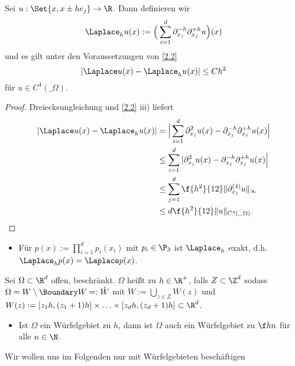 \begin{kor} \label{2.3}
	Sei $u : \Set{x, x \pm h e_j} \to \R$.
	Dann definieren wir
	\begin{equation} \label{eq:2.1}
		\Laplace_h u(x) :=
		\Big(\sum_{i=1}^d \partial_{x_j}^{-h} \partial_{x_j}^{+h} u \Big) (x)
	\end{equation}
	und es gilt unter den Voraussetzungen von \ref{2.2}
	\[
		|\Laplace u(x) - \Laplace_h u(x)| \le C h^2
	\]
	für $u \in C^4(\_\Omega)$.
	\begin{proof}
		Dreiecksungleichung und \ref{2.2} iii) liefert
		\begin{align*}
			|\Laplace u(x) - \Laplace_h u(x)|
			&= \Big| \sum_{i=1}^d \partial_{x_j}^2 u(x) - \partial_{x_j}^{-h} \partial_{x_j}^{+h} u(x) \Big| \\
			&\le \sum_{i=1}^d | \partial_{x_j}^2 u(x) - \partial_{x_j}^{-h} \partial_{x_j}^{+h} u(x) \Big| \\
			&\le \sum_{j=1}^d \f {h^2}{12} \|\partial_{x_j}^{(4)} u\|_\infty \\
			&\le d \f {h^2}{12} \|u\|_{C^4(\_\Omega)}.
		\end{align*}
	\end{proof}
	\begin{note}
		\begin{itemize}
			\item
				Für $p(x) := \prod_{i=1}^d p_i(x_i)$ mit $p_i \in \P_3$ ist $\Laplace_h$ exakt, d.h. $\Laplace_h p(x) = \Laplace p(x)$.
		\end{itemize}
	\end{note}
\end{kor}


\begin{df}[Würfelgebiet] \label{2.4}
	Sei $\Omega \subset \R^d$ offen, beschränkt.
	$\Omega$ heißt  zu $h \in \R^+$, falls $Z \subset \Z^d$ sodass $\Omega = W \setminus \Boundary W =: \mathring W$ mit $W := \bigcup_{z \in Z} W(z)$ und $W(z) := [z_1h , (z_1+1)h] \times \dotsc \times [z_d h, (z_d+1)h] \subset \R^d$.
	\begin{note}
		\begin{itemize}
			\item
				Ist $\Omega$ ein Würfelgebiet zu $h$, dann ist $\Omega$ auch ein Würfelgebiet zu $\f hn$ für alle $n \in \N$.
		\end{itemize}
	\end{note}
\end{df}

Wir wollen uns im Folgenden nur mit Würfelgebieten beschäftigen

